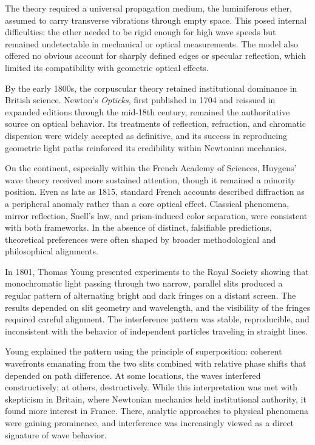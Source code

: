 The theory required a universal propagation medium, the luminiferous ether, assumed to carry transverse vibrations through empty space. This posed internal difficulties: the ether needed to be rigid enough for high wave speeds but remained undetectable in mechanical or optical measurements. The model also offered no obvious account for sharply defined edges or specular reflection, which limited its compatibility with geometric optical effects.

By the early 1800s, the corpuscular theory retained institutional dominance in British science. Newton's \textit{Opticks}, first published in 1704 and reissued in expanded editions through the mid-18th century, remained the authoritative source on optical behavior. Its treatments of reflection, refraction, and chromatic dispersion were widely accepted as definitive, and its success in reproducing geometric light paths reinforced its credibility within Newtonian mechanics.

On the continent, especially within the French Academy of Sciences, Huygens' wave theory received more sustained attention, though it remained a minority position. Even as late as 1815, standard French accounts described diffraction as a peripheral anomaly rather than a core optical effect. Classical phenomena, mirror reflection, Snell's law, and prism-induced color separation, were consistent with both frameworks. In the absence of distinct, falsifiable predictions, theoretical preferences were often shaped by broader methodological and philosophical alignments.

In 1801, Thomas Young presented experiments to the Royal Society showing that monochromatic light passing through two narrow, parallel slits produced a regular pattern of alternating bright and dark fringes on a distant screen. The results depended on slit geometry and wavelength, and the visibility of the fringes required careful alignment. The interference pattern was stable, reproducible, and inconsistent with the behavior of independent particles traveling in straight lines.

Young explained the pattern using the principle of superposition: coherent wavefronts emanating from the two slits combined with relative phase shifts that depended on path difference. At some locations, the waves interfered constructively; at others, destructively. While this interpretation was met with skepticism in Britain, where Newtonian mechanics held institutional authority, it found more interest in France. There, analytic approaches to physical phenomena were gaining prominence, and interference was increasingly viewed as a direct signature of wave behavior.

